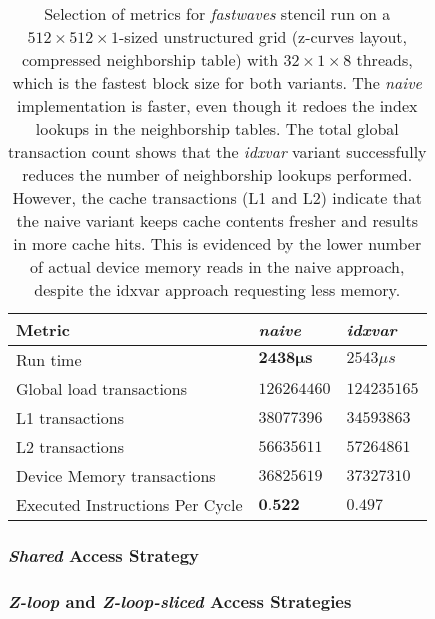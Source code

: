 \begin{table}
	\begin{tabular}{l l l}
		\hline
		Metric & \emph{naive} & \emph{idxvar} \\
		\hline
		Run time & $\mathbf{2438\mu s}$ & $2543\mu s$ \\
		Global load transactions & $126264460$ & $124235165$ \\
		L1 transactions & $38077396$ & $34593863$ \\
		L2 transactions & $56635611$ & $57264861$ \\
		Device Memory transactions & $36825619$ & $37327310$ \\
		Executed Instructions Per Cycle & $\textbf{0.522}$ & $0.497$ \\
		\hline
	\end{tabular}
	\caption{\label{tab:fastwaves-naive-idxvar-metrics}Selection of metrics for \emph{fastwaves} stencil run on a $512\times 512\times 1$-sized unstructured grid (z-curves layout, compressed neighborship table) with $32\times 1\times 8$ threads, which is the fastest block size for both variants. The \emph{naive} implementation is faster, even though it redoes the index lookups in the neighborship tables. The total global transaction count shows that the \emph{idxvar} variant successfully reduces the number of neighborship lookups performed. However, the cache transactions (L1 and L2) indicate that the naive variant keeps cache contents fresher and results in more cache hits. This is evidenced by the lower number of actual device memory reads in the naive approach, despite the idxvar approach requesting less memory.}
\end{table}

\subsubsection{\emph{Shared} Access Strategy}


\subsubsection{\emph{Z-loop} and \emph{Z-loop-sliced} Access Strategies}


